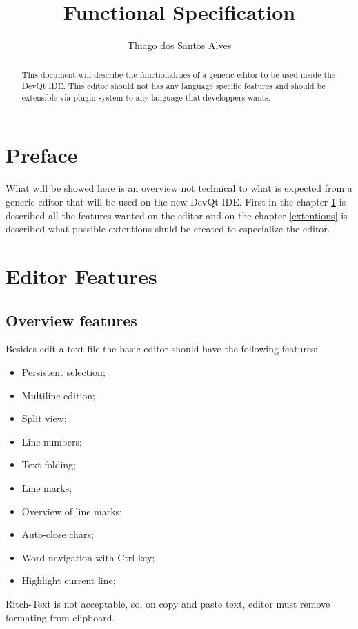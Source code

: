\documentclass[11pt,a4paper]{report}
\author{Thiago dos Santos Alves}
\title{Functional Specification}
\begin{document}
\maketitle
\tableofcontents

\begin{abstract}
This document will describe the functionalities of a generic editor to be used inside the DevQt IDE. This editor should not has any language specific features and should be extensible via plugin system to any language that developpers wants.
\end{abstract}

\chapter*{Preface}
What will be showed here is an overview not technical to what is expected from a generic editor that will be used on the new DevQt IDE. First in the chapter \ref{editorFeatures} is described all the features wanted on the editor and on the chapter \ref{extentions} is described what possible extentions shuld be created to especialize the editor.

\chapter{Editor Features} \label{editorFeatures}

\section{Overview features}
Besides edit a text file the basic editor should have the following features:

\begin{itemize}
\item Persistent selection;
\item Multiline edition;
\item Split view;
\item Line numbers;
\item Text folding;
\item Line marks;
\item Overview of line marks;
\item Auto-close chars;
\item Word navigation with Ctrl key;
\item Highlight current line;
\end{itemize}

Ritch-Text is not acceptable, so, on copy and paste text, editor must remove formating from clipboard.
\end{document}
